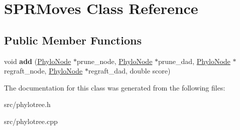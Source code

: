 \hypertarget{classSPRMoves}{
\section{SPRMoves Class Reference}
\label{classSPRMoves}
}
\subsection*{Public Member Functions}
\begin{DoxyCompactItemize}
\item 
\hypertarget{classSPRMoves_a93955f968fb9d282961e412a7d8d327c}{
void {\bfseries add} (\hyperlink{classPhyloNode}{PhyloNode} $\ast$prune\_\-node, \hyperlink{classPhyloNode}{PhyloNode} $\ast$prune\_\-dad, \hyperlink{classPhyloNode}{PhyloNode} $\ast$regraft\_\-node, \hyperlink{classPhyloNode}{PhyloNode} $\ast$regraft\_\-dad, double score)}
\label{classSPRMoves_a93955f968fb9d282961e412a7d8d327c}

\end{DoxyCompactItemize}


The documentation for this class was generated from the following files:\begin{DoxyCompactItemize}
\item 
src/phylotree.h\item 
src/phylotree.cpp\end{DoxyCompactItemize}
